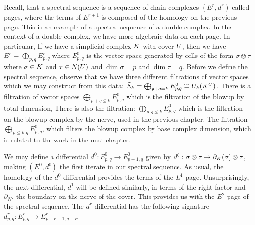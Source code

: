 Recall, that a spectral sequence is a sequence of chain complexes $(E^r, d^r)$ called pages, where the terms of $E^{r+1}$ is composed of the homology on the previous page. This is an example of a spectral sequence of a double complex. In the context of a double complex, we have more algebraic data on each page. In particular, If we have a simplicial complex $K$ with cover $U$, then we have $E^r = \bigoplus_{p,q} E^r_{p,q}$ where $E^0_{p,q}$ is the vector space generated by cells of the form $\sigma \otimes \tau$ where $\sigma \in K$ and $\tau \in N(U)$ and $\dim{\sigma} = p$ and $\dim{\tau} = q$. Before we define the spectral sequence, observe that we have three different filtrations of vector spaces which we may construct from this data: $\tilde{E}_k = \bigoplus_{p+q=k} E^0_{p,q} \cong U_k(K^U)$. There is a filtration of vector spaces $\bigoplus_{p+q \leq k} E^0_{p,q}$ which is the filtration of the blowup by total dimension, There is also the filtration: $\bigoplus_{p, q \leq k} E^0_{p,q}$ which is the filtration on the blowup complex by the nerve, used in the previous chapter. The filtration $\bigoplus_{p \leq k, q} E^0_{p,q}$, which filters the blowup complex by base complex dimension, which is related to the work in the next chapter.

We may define a differential $d^0: E^0_{p,q} \rightarrow E^0_{p-1,q}$ given by $d^0: \sigma \otimes \tau \rightarrow \partial_K(\sigma) \otimes \tau$, making $(E^0, d^0)$ the first iterate in our spectral sequence. As usual, the homology of the $d^0$ differential provides the terms of the $E^1$ page. Unsurprisingly, the next differential, $d^1$ will be defined similarly, in terms of the right factor and $\partial_N$, the boundary on the nerve of the cover. This provides us with the $E^2$ page of the spectral sequence. The $d^r$ differential has the following signature $d^r_{p,q}: E^r_{p,q} \rightarrow E^r_{p+r-1, q-r}$.